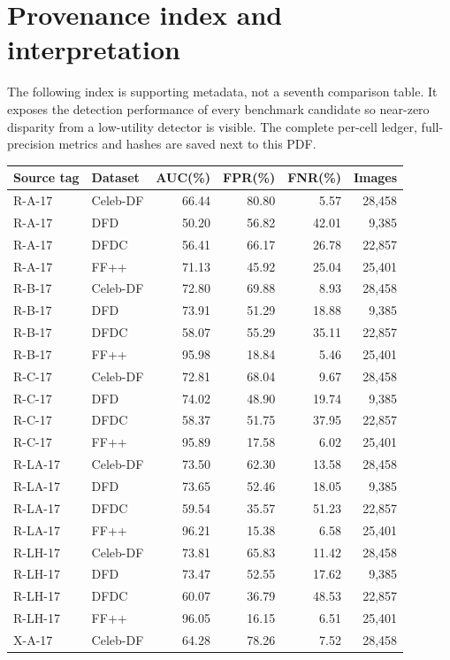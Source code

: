 \documentclass[10pt]{article}
\newcommand{\note}[1]{{\fontsize{8}{10}\selectfont #1\par}}
\begin{document}
\clearpage\section*{Provenance index and interpretation}
\note{The following index is supporting metadata, not a seventh comparison table. It exposes the detection performance of every benchmark candidate so near-zero disparity from a low-utility detector is visible. The complete per-cell ledger, full-precision metrics and hashes are saved next to this PDF.}
{\fontsize{8}{9}\selectfont\begin{longtable}{llrrrr}\toprule Source tag & Dataset & AUC(\%) & FPR(\%) & FNR(\%) & Images\\\midrule\endhead
R-A-17 & Celeb-DF & 66.44 & 80.80 & 5.57 & 28,458\\
R-A-17 & DFD & 50.20 & 56.82 & 42.01 & 9,385\\
R-A-17 & DFDC & 56.41 & 66.17 & 26.78 & 22,857\\
R-A-17 & FF++ & 71.13 & 45.92 & 25.04 & 25,401\\
R-B-17 & Celeb-DF & 72.80 & 69.88 & 8.93 & 28,458\\
R-B-17 & DFD & 73.91 & 51.29 & 18.88 & 9,385\\
R-B-17 & DFDC & 58.07 & 55.29 & 35.11 & 22,857\\
R-B-17 & FF++ & 95.98 & 18.84 & 5.46 & 25,401\\
R-C-17 & Celeb-DF & 72.81 & 68.04 & 9.67 & 28,458\\
R-C-17 & DFD & 74.02 & 48.90 & 19.74 & 9,385\\
R-C-17 & DFDC & 58.37 & 51.75 & 37.95 & 22,857\\
R-C-17 & FF++ & 95.89 & 17.58 & 6.02 & 25,401\\
R-LA-17 & Celeb-DF & 73.50 & 62.30 & 13.58 & 28,458\\
R-LA-17 & DFD & 73.65 & 52.46 & 18.05 & 9,385\\
R-LA-17 & DFDC & 59.54 & 35.57 & 51.23 & 22,857\\
R-LA-17 & FF++ & 96.21 & 15.38 & 6.58 & 25,401\\
R-LH-17 & Celeb-DF & 73.81 & 65.83 & 11.42 & 28,458\\
R-LH-17 & DFD & 73.47 & 52.55 & 17.62 & 9,385\\
R-LH-17 & DFDC & 60.07 & 36.79 & 48.53 & 22,857\\
R-LH-17 & FF++ & 96.05 & 16.15 & 6.51 & 25,401\\
X-A-17 & Celeb-DF & 64.28 & 78.26 & 7.52 & 28,458\\

\end{longtable}}
\end{document}
